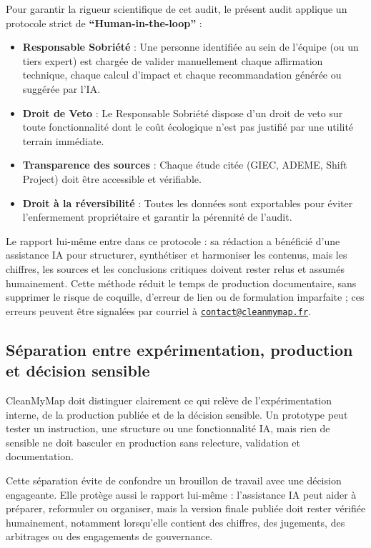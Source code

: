 \documentclass[
  10pt,
  a4paper,
  DIV=11,
  numbers=noendperiod,
  oneside]{scrreprt}
\providecommand{\tightlist}{%
  \setlength{\itemsep}{0pt}\setlength{\parskip}{0pt}}
\let\oldtextbf\textbf
\renewcommand{\textbf}[1]{\oldtextbf{\textcolor{cmmnavy}{#1}}}
\begin{document}
Pour garantir la rigueur scientifique de cet audit, le présent audit
applique un protocole strict de \textbf{``Human-in-the-loop''} :

\begin{itemize}
\tightlist
\item
  \textbf{Responsable Sobriété} : Une personne identifiée au sein de
  l'équipe (ou un tiers expert) est chargée de valider manuellement
  chaque affirmation technique, chaque calcul d'impact et chaque
  recommandation générée ou suggérée par l'IA.
\item
  \textbf{Droit de Veto} : Le Responsable Sobriété dispose d'un droit de
  veto sur toute fonctionnalité dont le coût écologique n'est pas
  justifié par une utilité terrain immédiate.
\item
  \textbf{Transparence des sources} : Chaque étude citée (GIEC, ADEME,
  Shift Project) doit être accessible et vérifiable.
\item
  \textbf{Droit à la réversibilité} : Toutes les données sont
  exportables pour éviter l'enfermement propriétaire et garantir la
  pérennité de l'audit.
\end{itemize}

Le rapport lui-même entre dans ce protocole : sa rédaction a bénéficié
d'une assistance IA pour structurer, synthétiser et harmoniser les
contenus, mais les chiffres, les sources et les conclusions critiques
doivent rester relus et assumés humainement. Cette méthode réduit le
temps de production documentaire, sans supprimer le risque de coquille,
d'erreur de lien ou de formulation imparfaite ; ces erreurs peuvent être
signalées par courriel à
\href{mailto:contact@cleanmymap.fr}{\nolinkurl{contact@cleanmymap.fr}}.

\subsection{Séparation entre expérimentation, production et décision
sensible}\label{suxe9paration-entre-expuxe9rimentation-production-et-duxe9cision-sensible}

CleanMyMap doit distinguer clairement ce qui relève de l'expérimentation
interne, de la production publiée et de la décision sensible. Un
prototype peut tester un instruction, une structure ou une
fonctionnalité IA, mais rien de sensible ne doit basculer en production
sans relecture, validation et documentation.

Cette séparation évite de confondre un brouillon de travail avec une
décision engageante. Elle protège aussi le rapport lui-même :
l'assistance IA peut aider à préparer, reformuler ou organiser, mais la
version finale publiée doit rester vérifiée humainement, notamment
lorsqu'elle contient des chiffres, des jugements, des arbitrages ou des
engagements de gouvernance.
\end{document}
